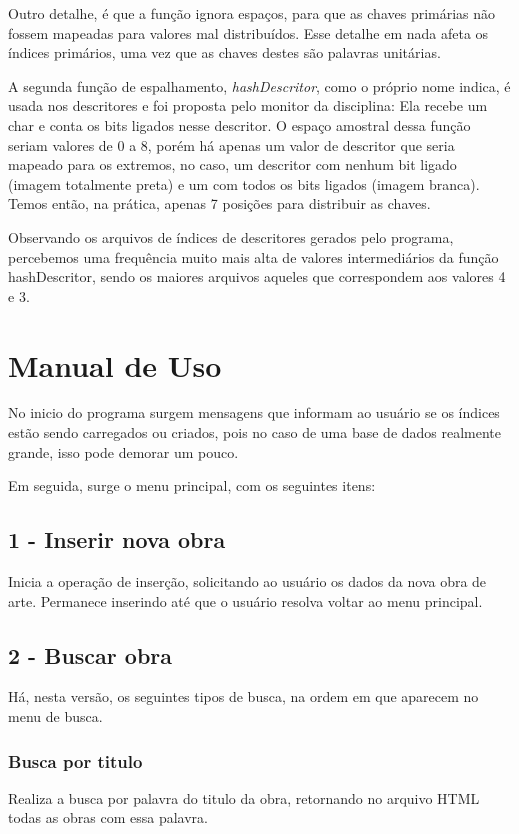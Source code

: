 Outro detalhe, é que a função ignora espaços, para que as chaves primárias não fossem mapeadas para valores mal distribuídos. Esse detalhe em nada afeta os índices primários, uma vez que as chaves destes são palavras unitárias.

A segunda função de espalhamento, \textit{hashDescritor}, como o próprio nome indica, é usada nos descritores e foi proposta pelo monitor da disciplina: Ela recebe um char e conta os bits ligados nesse descritor. O espaço amostral dessa função seriam valores de 0 a 8, porém há apenas um valor de descritor que seria mapeado para os extremos, no caso, um descritor com nenhum bit ligado (imagem totalmente preta) e um com todos os bits ligados (imagem branca). Temos então, na prática, apenas 7 posições para distribuir as chaves.

Observando os arquivos de índices de descritores gerados pelo programa, percebemos uma frequência muito mais alta de valores intermediários da função hashDescritor, sendo os maiores arquivos aqueles que correspondem aos valores 4 e 3.

\section{Manual de Uso}
No inicio do programa surgem mensagens que informam ao usuário se os índices estão sendo carregados ou criados, pois no caso de uma base de dados realmente grande, isso pode demorar um pouco.

Em seguida, surge o menu principal, com os seguintes itens:

\subsection{1 - Inserir nova obra}
Inicia a operação de inserção, solicitando ao usuário os dados da nova obra de arte. Permanece inserindo até que o usuário resolva voltar ao menu principal.

\subsection{2 - Buscar obra}
Há, nesta versão, os seguintes tipos de busca, na ordem em que aparecem no menu de busca.

\subsubsection{Busca por titulo}
Realiza a busca por palavra do titulo da obra, retornando no arquivo HTML todas as obras com essa palavra.

